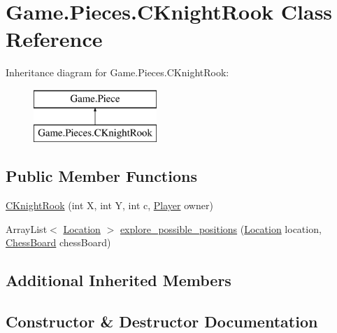 \hypertarget{class_game_1_1_pieces_1_1_c_knight_rook}{}\section{Game.\+Pieces.\+C\+Knight\+Rook Class Reference}
\label{class_game_1_1_pieces_1_1_c_knight_rook}
Inheritance diagram for Game.\+Pieces.\+C\+Knight\+Rook\+:\begin{figure}[H]
\begin{center}
\leavevmode
\includegraphics[height=2.000000cm]{class_game_1_1_pieces_1_1_c_knight_rook}
\end{center}
\end{figure}
\subsection*{Public Member Functions}
\begin{DoxyCompactItemize}
\item 
\hyperlink{class_game_1_1_pieces_1_1_c_knight_rook_ae86517971e5efa7e0ed0239a6138866b}{C\+Knight\+Rook} (int X, int Y, int c, \hyperlink{class_game_1_1_player}{Player} owner)
\item 
Array\+List$<$ \hyperlink{class_game_1_1_location}{Location} $>$ \hyperlink{class_game_1_1_pieces_1_1_c_knight_rook_addc2807f8d6c75a8e5bddcd098db5fb9}{explore\+\_\+possible\+\_\+positions} (\hyperlink{class_game_1_1_location}{Location} location, \hyperlink{class_game_1_1_chess_board}{Chess\+Board} chess\+Board)
\end{DoxyCompactItemize}
\subsection*{Additional Inherited Members}


\subsection{Constructor \& Destructor Documentation}
\mbox{\label{class_game_1_1_pieces_1_1_c_knight_rook_ae86517971e5efa7e0ed0239a6138866b}} 
